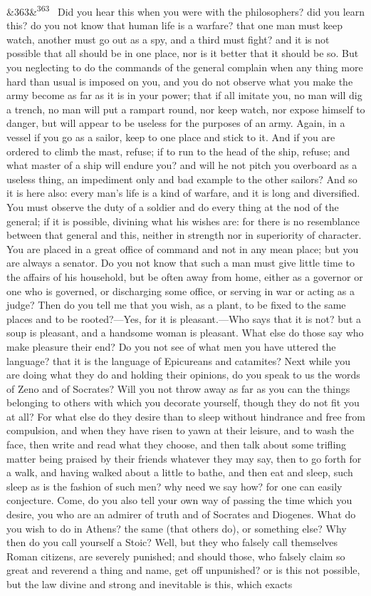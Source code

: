 \documentclass[12pt]{article}
\newcommand{\para}[1][]{\par\noindent\ifx&#1&\else\textsuperscript{\footnotesize #1}~\fi}
\begin{document}
\para[363] Did you hear this when you were with the philosophers? did you learn this? do you not know that human life is a warfare? that one man must keep watch, another must go out as a spy, and a third must fight? and it is not possible that all should be in one place, nor is it better that it should be so. But you neglecting to do the commands of the general complain when any thing more hard than usual is imposed on you, and you do not observe what you make the army become as far as it is in your power; that if all imitate you, no man will dig a trench, no man will put a rampart round, nor keep watch, nor expose himself to danger, but will appear to be useless for the purposes of an army. Again, in a vessel if you go as a sailor, keep to one place and stick to it. And if you are ordered to climb the mast, refuse; if to run to the head of the ship, refuse; and what master of a ship will endure you? and will he not pitch you overboard as a useless thing, an impediment only and bad example to the other sailors? And so it is here also: every man's life is a kind of warfare, and it is long and diversified. You must observe the duty of a soldier and do every thing at the nod of the general; if it is possible, divining what his wishes are: for there is no resemblance between that general and this, neither in strength nor in superiority of character. You are placed in a great office of command and not in any mean place; but you are always a senator. Do you not know that such a man must give little time to the affairs of his household, but be often away from home, either as a governor or one who is governed, or discharging some office, or serving in war or acting as a judge? Then do you tell me that you wish, as a plant, to be fixed to the same places and to be rooted?—Yes, for it is pleasant.—Who says that it is not? but a soup is pleasant, and a handsome woman is pleasant. What else do those say who make pleasure their end? Do you not see of what men you have uttered the language? that it is the language of Epicureans and catamites? Next while you are doing what they do and holding their opinions, do you speak to us the words of Zeno and of Socrates? Will you not throw away as far as you can the things belonging to others with which you decorate yourself, though they do not fit you at all? For what else do they desire than to sleep without hindrance and free from compulsion, and when they have risen to yawn at their leisure, and to wash the face, then write and read what they choose, and then talk about some trifling matter being praised by their friends whatever they may say, then to go forth for a walk, and having walked about a little to bathe, and then eat and sleep, such sleep as is the fashion of such men? why need we say how? for one can easily conjecture. Come, do you also tell your own way of passing the time which you desire, you who are an admirer of truth and of Socrates and Diogenes. What do you wish to do in Athens? the same (that others do), or something else? Why then do you call yourself a Stoic? Well, but they who falsely call themselves Roman citizens, are severely punished; and should those, who falsely claim so great and reverend a thing and name, get off unpunished? or is this not possible, but the law divine and strong and inevitable is this, which exacts 
\end{document}
